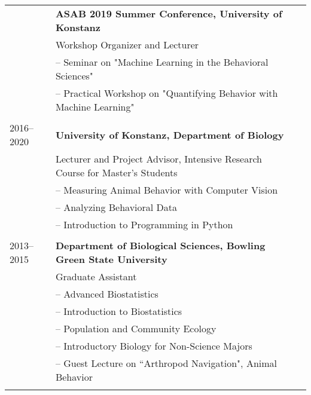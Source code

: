 \documentclass[letterpaper,10pt,oneside]{article}
\begin{document}
\begin{small}
\begin{longtable}{@{} l p{5.3in}l}
	& \textbf{ASAB 2019 Summer Conference, University of Konstanz} \\
	& Workshop Organizer and Lecturer\\
	& – Seminar on "Machine Learning in the Behavioral Sciences" \\
	& – Practical Workshop on "Quantifying Behavior with Machine Learning" \\
	& \\
 \large{2016–2020}
    & \textbf{University of Konstanz, Department of Biology} \\
     & Lecturer and Project Advisor, Intensive Research Course for Master's Students \\
     & – Measuring Animal Behavior with Computer Vision \\
     & – Analyzing Behavioral Data \\
     & – Introduction to Programming in Python\\
     & \\
 \large{2013–2015}
 & \textbf{Department of Biological Sciences, Bowling Green State University} \\
 & Graduate Assistant \\
 & – Advanced Biostatistics\\
 & – Introduction to Biostatistics \\
 & – Population and Community Ecology \\
 & – Introductory Biology for Non-Science Majors \\
 & – Guest Lecture on ``Arthropod Navigation", Animal Behavior \\
 & \\
 

\end{longtable}
\end{small}
\end{document}
